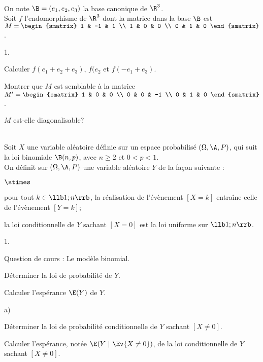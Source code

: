 \documentclass[11pt]{article}%
\begin{document}
\begin{exerciceSP}~\\
  On note $\B = (e_1 , e_2 , e_3)$ la base canonique de $\R^3$. \\
  Soit $f$ l'endomorphisme de $\R^3$ dont la matrice dans la base
  $\B$ est $M = 
  \begin{smatrix} 
    1 & -1 & 1 \\
    1 & 0 & 0 \\
    0 & 1 & 0 
  \end{smatrix}$. 
  \begin{noliste}{1.}
    \setlength{\itemsep}{2mm}
  \item Calculer $f(e_1 + e_2 + e_3)$, $f(e_2$ et $f(-e_1 + e_3)$.
  \item Montrer que $M$ est semblable à la matrice $M'
    = \begin{smatrix} 
      1 & 0 & 0 \\ 
      0 & 0 & -1 \\ 
      0 & 1 & 0
    \end{smatrix}$.
  \item $M$ est-elle diagonalisable?
  \end{noliste}
\end{exerciceSP}




\begin{exerciceAP}~\\
  Soit $X$ une variable aléatoire définie sur un espace probabilisé
  $(\Omega , \A , P)$, qui suit la loi binomiale $\B (n ,
  p)$, avec $n \geq 2$ et $0 < p < 1$.
  \\[.2cm]
  On définit sur $(\Omega , \A , P)$ une variable aléatoire $Y$ de la
  façon suivante :
  \begin{noliste}{$\stimes$}
  \item pour tout $k \in \llb 1 ; n \rrb$, la réalisation de
    l'évènement $[X=k]$ entraîne celle de l'évènement $[Y=k]$;
  \item la loi conditionnelle de $Y$ sachant $[X=0]$ est la loi
    uniforme sur $\llb 1 ; n \rrb$.
  \end{noliste}
  \begin{noliste}{1.}
    \setlength{\itemsep}{2mm}
  \item Question de cours : Le modèle binomial. 
  \item Déterminer la loi de probabilité de $Y$.
  \item Calculer l'espérance $\E(Y)$ de $Y$.
  \item 
    \begin{noliste}{a)}
    \setlength{\itemsep}{2mm} \item Déterminer la loi de probabilité
      conditionnelle de $Y$ sachant $[X \neq 0]$.
    \item Calculer l'espérance, notée $\E(Y \ | \ \Ev{X \neq 0})$, de
      la loi conditionnelle de $Y$ sachant $[X \neq 0]$.
    \end{noliste}
  \end{noliste}
\end{exerciceAP}
\end{document}
